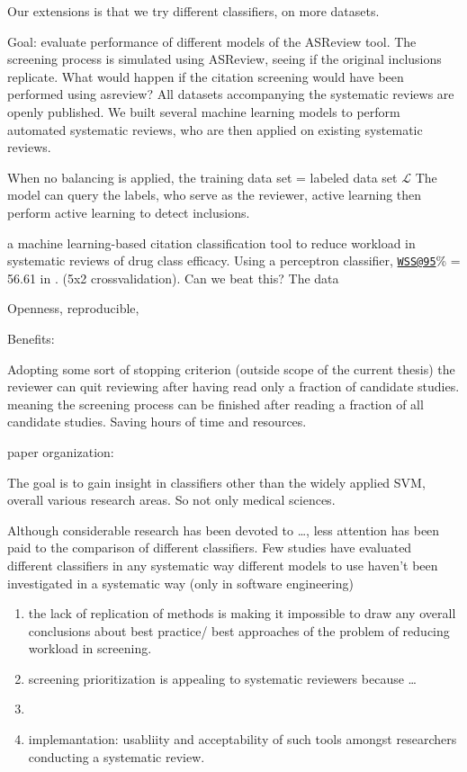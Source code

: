 \documentclass[
]{article}
\providecommand{\tightlist}{%
  \setlength{\itemsep}{0pt}\setlength{\parskip}{0pt}}
\begin{document}
Our extensions is that we try different classifiers, on more datasets.

Goal: evaluate performance of different models of the ASReview tool. The
screening process is simulated using ASReview, seeing if the original
inclusions replicate. What would happen if the citation screening would
have been performed using asreview? All datasets accompanying the
systematic reviews are openly published. We built several machine
learning models to perform automated systematic reviews, who are then
applied on existing systematic reviews.

When no balancing is applied, the training data set = labeled data set
\(\mathcal{L}\) The model can query the labels, who serve as the
reviewer, active learning then perform active learning to detect
inclusions.

a machine learning-based citation classification tool to reduce workload
in systematic reviews of drug class efficacy. Using a perceptron
classifier, \href{mailto:WSS@95}{\nolinkurl{WSS@95}}\% = 56.61 in
\autocite{Cohen2006}. (5x2 crossvalidation). Can we beat this? The data

Openness, reproducible,

Benefits:

Adopting some sort of stopping criterion (outside scope of the current
thesis) the reviewer can quit reviewing after having read only a
fraction of candidate studies. meaning the screening process can be
finished after reading a fraction of all candidate studies. Saving hours
of time and resources.

paper organization:

The goal is to gain insight in classifiers other than the widely applied
SVM, overall various research areas. So not only medical sciences.

Although considerable research has been devoted to \ldots, less
attention has been paid to the comparison of different classifiers. Few
studies have evaluated different classifiers in any systematic way
different models to use haven't been investigated in a systematic way
(only in software engineering)

\begin{enumerate}
\def\labelenumi{\arabic{enumi})}
\tightlist
\item
  the lack of replication of methods is making it impossible to draw any
  overall conclusions about best practice/ best approaches of the
  problem of reducing workload in screening.
\item
  screening prioritization is appealing to systematic reviewers because
  \ldots{}
\item
\item
  implemantation: usabliity and acceptability of such tools amongst
  researchers conducting a systematic review.
\end{enumerate}
\end{document}
